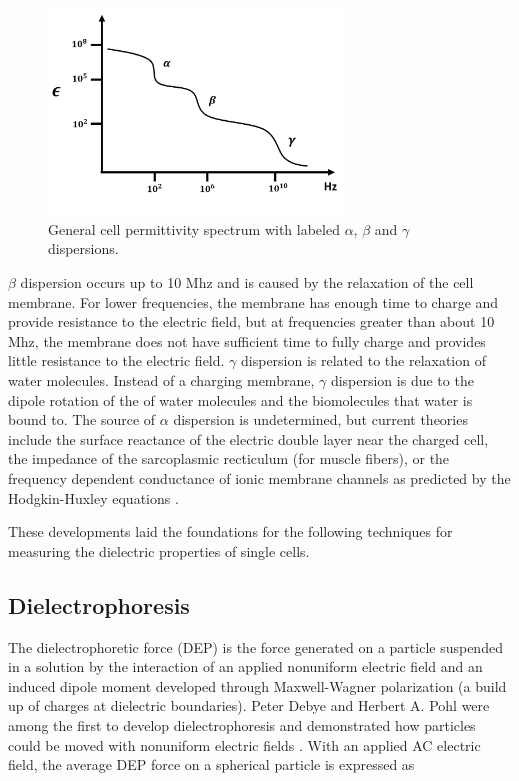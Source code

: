  \begin{figure}[ht]
 \centering
 \includegraphics[width=0.7\textwidth]{images/schwanDispersions.png}
 \caption[General cell permittivity spectrum]{General cell permittivity spectrum with labeled $\alpha$, $\beta$ and $\gamma$ dispersions.}
 \label{fig:schwan_dispersions}
 \end{figure}
 
 \par $\beta$ dispersion occurs up to 10 Mhz and is caused by the relaxation of the cell membrane. For lower frequencies, the membrane has enough time to charge and provide resistance to the electric field, but at frequencies greater than about 10 Mhz, the membrane does not have sufficient time to fully charge and provides little resistance to the electric field. $\gamma$ dispersion is related to the relaxation of water molecules. Instead of a charging membrane, $\gamma$ dispersion is due to the dipole rotation of the of water molecules and the biomolecules that water is bound to. The source of $\alpha$ dispersion is undetermined, but current theories include the surface reactance of the electric double layer near the charged cell, the impedance of the sarcoplasmic recticulum (for muscle fibers), or the frequency dependent conductance of ionic membrane channels as predicted by the Hodgkin-Huxley equations \cite{schwan_electrical_1994}.
 
 
 \par These developments laid the foundations for the following techniques for measuring the dielectric properties of single cells. 
 
 \subsection{Dielectrophoresis}
 \par The dielectrophoretic force (DEP) is the force generated on a particle suspended in a solution by the interaction of an applied nonuniform electric field and an induced dipole moment developed through Maxwell-Wagner polarization (a build up of charges at dielectric boundaries). Peter Debye and Herbert A. Pohl were among the first to develop dielectrophoresis and demonstrated how particles could be moved with nonuniform electric fields \cite{muller_potential_2003}. With an applied AC electric field, the average DEP force on a spherical particle is expressed as \cite{morgan_single_2007, green_dielectrophoresis_1999}
 
